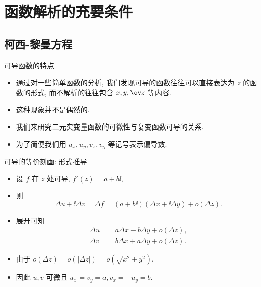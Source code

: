\section{函数解析的充要条件}

\subsection{柯西-黎曼方程}
\begin{frame}{可导函数的特点}
	\begin{itemize}
		\item 通过对一些简单函数的分析, 我们发现可导的函数往往可以直接表达为 $z$ 的函数的形式, 而不解析的往往包含 $x,y,\ov z$ 等内容.
		\item 这种现象并不是偶然的.
		\item 我们来研究二元实变量函数的可微性与复变函数可导的关系.
		\item 为了简便我们用 $u_x,u_y,v_x,v_y$ 等记号表示偏导数.
	\end{itemize}
\end{frame}


\begin{frame}{可导的等价刻画: 形式推导}
	\begin{itemize}
		\item 设 \alert{$f$ 在 $z$ 处可导}, $f'(z)=a+b\ii$,
		\item 则
		\[
			\Delta u+\ii\Delta v
			=\Delta f
			=(a+b\ii)(\Delta x+\ii\Delta y)+o(\Delta z).
		\]
		\item 展开可知
		\begin{align*}
			\Delta u&=a\Delta x-b\Delta y+o(\Delta z),\\
			\Delta v&=b\Delta x+a\Delta y+o(\Delta z).
		\end{align*}
		\item 由于 $o(\Delta z)=o(|\Delta z|)=o(\sqrt{x^2+y^2})$,
		\item 因此 \alert{$u,v$ 可微且 $u_x=v_y=a,v_x=-u_y=b$}.
	\end{itemize}
\end{frame}


